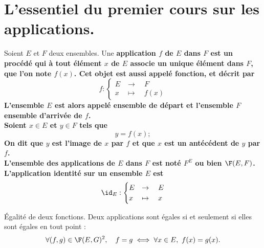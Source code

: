 \documentclass[11pt]{article}
\begin{document}


\thispagestyle{fancy}

\section*{L'essentiel du premier cours sur les applications.}

\begin{defi}{}{}
    Soient $E$ et $F$ deux ensembles.\n
    Une \bf{application} $f$ de $E$ dans $F$ est un procédé qui à tout élément $x$ de $E$ associe un unique élément dans $F$, que l'on note $f(x)$. Cet objet est aussi appelé \bf{fonction}, et décrit par
    \begin{equation*}
        f:\begin{cases}
            E &\to \quad F\\
            x &\mapsto \quad f(x)
        \end{cases}
    \end{equation*}
    L'ensemble $E$ est alors appelé \bf{ensemble de départ} et l'ensemble $F$ \bf{ensemble d'arrivée} de $f$.\\
    Soient $x\in E$ et $y\in F$ tels que
    \begin{equation*}
        y=f(x);
    \end{equation*}
    On dit que $y$ est l'\bf{image} de $x$ par $f$ et que $x$ est un \bf{antécédent} de $y$ par $f$.\\
    L'ensemble des applications de $E$ dans $F$ est noté $F^E$ ou bien $\F(E,F)$.\\
    L'application \bf{identité} sur un ensemble $E$ est
    \begin{equation*}
        \id_E : \begin{cases}
            E &\to \quad E\\
            x &\mapsto \quad x
        \end{cases}
    \end{equation*} 
\end{defi}

\begin{prop}{Égalité de deux fonctions.}{}
    Deux applications sont égales si et seulement si elles sont égales en tout point :
    \begin{equation*}
        \forall (f,g) \in \F(E,G)^2, \quad f = g \iff \forall x \in E, ~ f(x) = g(x).
    \end{equation*}
\end{prop}
\end{document}

